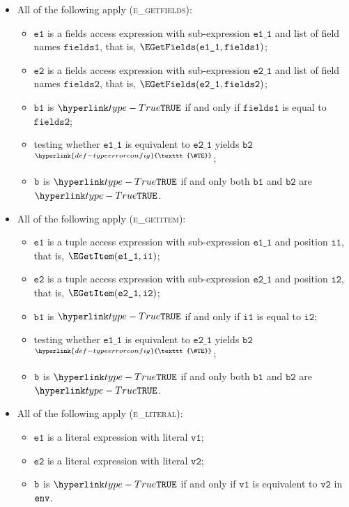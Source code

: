 \documentclass{book}
\newcommand\TypeErrorConfig[0]{\hyperlink{def-typeerrorconfig}{\texttt{\#TE}}}
\newcommand\ProseOrTypeError[0]{\hyperlink{def-proseortypeerror}{$^{\TypeErrorConfig}$}}
\newcommand\vione[0]{\texttt{i1}}
\newcommand\vitwo[0]{\texttt{i2}}
\newcommand\vvone[0]{\texttt{v1}}
\newcommand\vvtwo[0]{\texttt{v2}}
\newcommand\veone[0]{\texttt{e1}}
\newcommand\vetwo[0]{\texttt{e2}}
\newcommand\vfieldsone[0]{\texttt{fields1}}
\newcommand\vfieldstwo[0]{\texttt{fields2}}
\newcommand\veoneone[0]{\texttt{e1\_1}}
\newcommand\vetwoone[0]{\texttt{e2\_1}}
\newcommand\vbone[0]{\texttt{b1}}
\newcommand\vbtwo[0]{\texttt{b2}}
\begin{document}
\begin{itemize}
  \item All of the following apply (\textsc{e\_getfields}):
  \begin{itemize}
    \item $\veone$ is a fields access expression with sub-expression $\veoneone$ and list of field names $\vfieldsone$,
          that is, $\EGetFields(\veoneone, \vfieldsone)$;
    \item $\vetwo$ is a fields access expression with sub-expression $\vetwoone$ and list of field names $\vfieldstwo$,
          that is, $\EGetFields(\vetwoone, \vfieldstwo)$;
    \item $\vbone$ is $\True$ if and only if $\vfieldsone$ is equal to $\vfieldstwo$;
    \item testing whether $\veoneone$ is equivalent to $\vetwoone$ yields $\vbtwo$ \ProseOrTypeError;
    \item $\texttt{b}$ is $\True$ if and only both $\vbone$ and $\vbtwo$ are $\True$.
  \end{itemize}

  \item All of the following apply (\textsc{e\_getitem}):
  \begin{itemize}
    \item $\veone$ is a tuple access expression with sub-expression $\veoneone$ and position $\vione$,
          that is, $\EGetItem(\veoneone, \vione)$;
    \item $\vetwo$ is a tuple access expression with sub-expression $\vetwoone$ and position $\vitwo$,
          that is, $\EGetItem(\vetwoone, \vitwo)$;
    \item $\vbone$ is $\True$ if and only if $\vione$ is equal to $\vitwo$;
    \item testing whether $\veoneone$ is equivalent to $\vetwoone$ yields $\vbtwo$ \ProseOrTypeError;
    \item $\texttt{b}$ is $\True$ if and only both $\vbone$ and $\vbtwo$ are $\True$.
  \end{itemize}

  \item All of the following apply (\textsc{e\_literal}):
  \begin{itemize}
    \item $\veone$ is a literal expression with literal $\vvone$;
    \item $\vetwo$ is a literal expression with literal $\vvtwo$;
    \item $\texttt{b}$ is $\True$ if and only if $\vvone$ is equivalent to $\vvtwo$ in $\texttt{env}$.
  \end{itemize}


\end{itemize}
\end{document}
